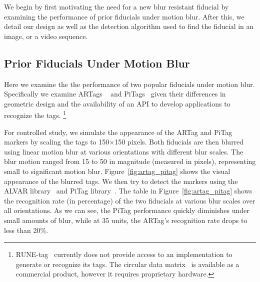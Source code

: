 \documentclass[10pt,twocolumn,letterpaper]{article}
\begin{document}
We begin by first motivating the need for a new blur resistant
fiducial by examining the performance of prior fiducials under motion
blur.  After this, we detail our design as well as the detection
algorithm used to find the fiducial in an image, or a video sequence.

\subsection{Prior Fiducials Under Motion Blur}\label{sec:blurtest}

Here we examine the the performance of two popular fiducials under
motion blur.  Specifically we examine ARTags ~\cite{Fiala05} and
PiTags~\cite{Pitag13} given their differences in geometric design and
the availability of an API to develop applications to recognize the tags.
\footnote{RUNE-tag~\cite{runetag11} currently does not
provide access to an implementation to generate or recognize its tags. 
The circular data matrix~\cite{NaimarkF02} is available as a
commercial product, however it requires proprietary hardware.}

For controlled study, we simulate the appearance of the ARTag and PiTag
markers by scaling the tags to 150$\times$150 pixels.
Both fiducials are then blurred using linear motion blur at various
orientations with different  blur scales. The blur motion ranged from 15 to 50
in magnitude (measured in pixels), representing small to significant motion
blur. Figure~\ref{fig:artag_pitag} shows the visual appearance of the blurred
tags. We then try to detect the markers using the ALVAR library~\cite{alvar} and
PiTag library~\cite{ros_pitag}. The table in %
Figure~\ref{fig:artag_pitag} shows the recognition rate (in
percentage) of the two fiducials at various blur scales over all  orientations.
As we can see, the PiTag performance quickly diminishes under small amounts of
blur, while at 35 units, the ARTag's recognition rate drops to less than
20\%.
\end{document}
